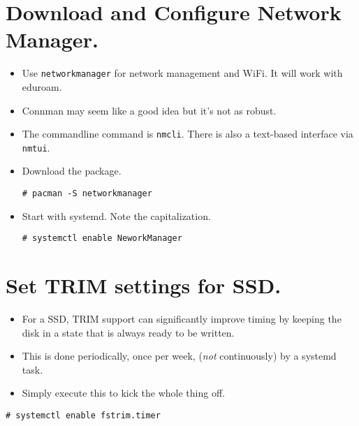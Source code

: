 \documentclass{article}
\begin{document}
\section{Download and Configure Network Manager.}
  \begin{itemize}
    \item Use \verb|networkmanager| for network management and WiFi. It will
      work with eduroam.
    \item Connman may seem like a good idea but it's not as robust.
    \item The commandline command is \verb|nmcli|. There is also a text-based
      interface via \verb|nmtui|.
    \item Download the package.  
\begin{verbatim}
# pacman -S networkmanager
\end{verbatim}
    \item Start with systemd. Note the capitalization.
\begin{verbatim}
# systemctl enable NeworkManager
\end{verbatim}
  \end{itemize}

\section{Set TRIM settings for SSD.}
  \begin{itemize}
    \item For a SSD, TRIM support can significantly improve timing by keeping
      the disk in a state that is always ready to be written.
    \item This is done periodically, once per week, (\emph{not} continuously) by
      a systemd task.
    \item Simply execute this to kick the whole thing off.
  \end{itemize}
\begin{verbatim}
# systemctl enable fstrim.timer
\end{verbatim}
\end{document}
